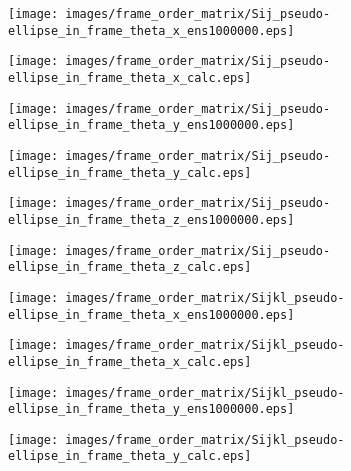 \documentclass[a4paper,11pt,twoside,openright]{book}
\def\lthtmlcheckvsize{\ifdim\ht\sizebox<\vsize 
  \ifdim\wd\sizebox<\hsize\expandafter\hfill\fi \expandafter\vfill
  \else\expandafter\vss\fi}%
\begin{document}
{\newpage\clearpage
{}%
\texttt{[image: images/frame\_order\_matrix/Sij\_pseudo-ellipse\_in\_frame\_theta\_x\_ens1000000.eps]}%
\lthtmlpictureZ
\lthtmlcheckvsize\clearpage}

{\newpage\clearpage
{}%
\texttt{[image: images/frame\_order\_matrix/Sij\_pseudo-ellipse\_in\_frame\_theta\_x\_calc.eps]}%
\lthtmlpictureZ
\lthtmlcheckvsize\clearpage}

{\newpage\clearpage
{}%
\texttt{[image: images/frame\_order\_matrix/Sij\_pseudo-ellipse\_in\_frame\_theta\_y\_ens1000000.eps]}%
\lthtmlpictureZ
\lthtmlcheckvsize\clearpage}

{\newpage\clearpage
{}%
\texttt{[image: images/frame\_order\_matrix/Sij\_pseudo-ellipse\_in\_frame\_theta\_y\_calc.eps]}%
\lthtmlpictureZ
\lthtmlcheckvsize\clearpage}

{\newpage\clearpage
{}%
\texttt{[image: images/frame\_order\_matrix/Sij\_pseudo-ellipse\_in\_frame\_theta\_z\_ens1000000.eps]}%
\lthtmlpictureZ
\lthtmlcheckvsize\clearpage}

{\newpage\clearpage
{}%
\texttt{[image: images/frame\_order\_matrix/Sij\_pseudo-ellipse\_in\_frame\_theta\_z\_calc.eps]}%
\lthtmlpictureZ
\lthtmlcheckvsize\clearpage}

{\newpage\clearpage
{}%
\texttt{[image: images/frame\_order\_matrix/Sijkl\_pseudo-ellipse\_in\_frame\_theta\_x\_ens1000000.eps]}%
\lthtmlpictureZ
\lthtmlcheckvsize\clearpage}

{\newpage\clearpage
{}%
\texttt{[image: images/frame\_order\_matrix/Sijkl\_pseudo-ellipse\_in\_frame\_theta\_x\_calc.eps]}%
\lthtmlpictureZ
\lthtmlcheckvsize\clearpage}

{\newpage\clearpage
{}%
\texttt{[image: images/frame\_order\_matrix/Sijkl\_pseudo-ellipse\_in\_frame\_theta\_y\_ens1000000.eps]}%
\lthtmlpictureZ
\lthtmlcheckvsize\clearpage}

{\newpage\clearpage
{}%
\texttt{[image: images/frame\_order\_matrix/Sijkl\_pseudo-ellipse\_in\_frame\_theta\_y\_calc.eps]}%
\lthtmlpictureZ
\lthtmlcheckvsize\clearpage}
\end{document}
